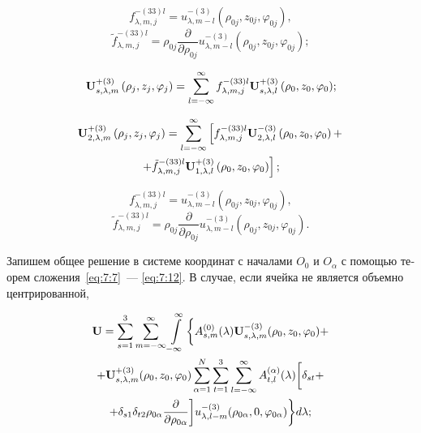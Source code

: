 \begin{russian}
$$
f_{\lambda ,m,j}^{ - (33)l} = u_{\lambda ,m - l}^{ - (3)}\left( {{\rho _{0j}},{z_{0j}},{\varphi _{0j}}} \right),
$$
$$
\tilde f_{\lambda ,m,j}^{ - (33)l} = {\rho _{0j}}\frac{\partial }{{\partial {\rho _{0j}}}}u_{\lambda ,m - l}^{ - (3)}\left( {{\rho _{0j}},{z_{0j}},{\varphi _{0j}}} \right);
$$

\begin{equation}
{\bf{U}}_{s,\lambda ,m}^{ + (3)}\left( {{\rho _j},{z_j},{\varphi _j}} \right) = \sum\limits_{l =  - \infty }^\infty  {f_{\lambda ,m,j}^{ - (33)l}{\bf{U}}_{s,\lambda ,l}^{ + (3)}\left( {{\rho _0},{z_0},{\varphi _0}} \right)};
\label{eq:7:11}
\end{equation}

\begin{multline}
{\bf{U}}_{2,\lambda ,m}^{ + (3)}\left( {{\rho _j},{z_j},{\varphi _j}} \right) = \sum\limits_{l =  - \infty }^\infty  {\left[ {f_{\lambda ,m,j}^{ - (33)l}{\bf{U}}_{2,\lambda ,l}^{ - (3)}\left( {{\rho _0},{z_0},{\varphi _0}} \right) + } \right.} \\
\left. { + \tilde f_{\lambda ,m,j}^{ - (33)l}{\bf{U}}_{1,\lambda ,l}^{ + (3)}\left( {{\rho _0},{z_0},{\varphi _0}} \right)} \right];
\label{eq:7:12}
\end{multline}

$$
f_{\lambda ,m,j}^{ - (33)l} = u_{\lambda ,m - l}^{ - (3)}\left( {{\rho _{0j}},{z_{0j}},{\varphi _{0j}}} \right),
$$
$$
\tilde f_{\lambda ,m,j}^{ - (33)l} = {\rho _{0j}}\frac{\partial }{{\partial {\rho _{0j}}}}u_{\lambda ,m - l}^{ - (3)}\left( {{\rho _{0j}},{z_{0j}},{\varphi _{0j}}} \right).
$$

Запишем общее решение в системе координат с началами $O_0$ и $O_\alpha$ с помощью теорем сложения~\eqref{eq:7:7}~--- \eqref{eq:7:12}. В случае, если ячейка не является объемно центрированной,

\begin{multline}
{\bf{U}} = \sum\limits_{s = 1}^3 {\sum\limits_{m =  - \infty }^\infty  {\int\limits_{ - \infty }^\infty\bigg\{  } } A_{s,m}^{(0)}(\lambda ){\bf{U}}_{s,\lambda ,m}^{ - (3)}({\rho _0},{z_0},{\varphi _0}) + \\
+ {\bf{U}}_{s,\lambda ,m}^{ + (3)}({\rho _0},{z_0},{\varphi _0})\sum\limits_{\alpha  = 1}^N {\sum\limits_{t = 1}^3 {\sum\limits_{l =  - \infty }^\infty  {A_{t,l}^{(\alpha )}} } } (\lambda )\bigg[{\delta _{st}} + \\
+ {\delta _{s1}}{\delta _{t2}}{\rho _{0\alpha }}\frac{\partial }{{\partial {\rho _{0\alpha }}}}\bigg]u_{\lambda ,l - m}^{ - (3)}({\rho _{0\alpha }},0,{\varphi _{0\alpha }})\bigg\} d\lambda;
\label{eq:7:13}
\end{multline}


\end{russian}

